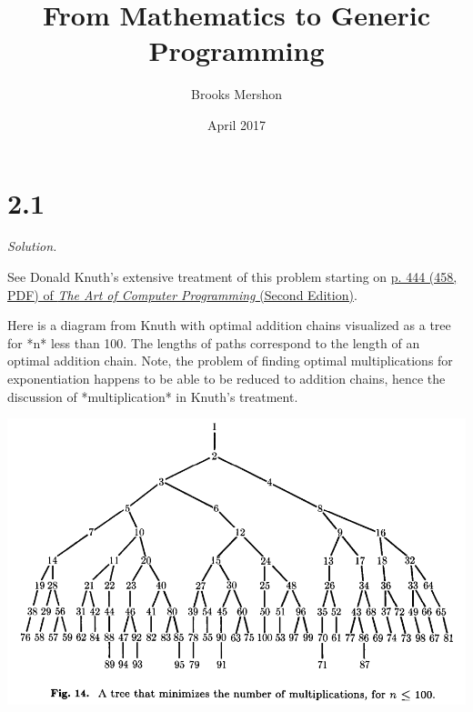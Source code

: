 \documentclass{article}
\title{From Mathematics to Generic Programming}
\author{Brooks Mershon}
\date{April 2017}
\begin{document}
\maketitle

\section*{2.1}


\textit{Solution.}

\bigskip

See Donald Knuth's extensive treatment of this problem starting on \href{http://library.aceondo.net/ebooks/Computer_Science/algorithm-the_art_of_computer_programming-knuth.pdf}{p. 444 (458, PDF) of \textit{The Art of Computer Programming} (Second Edition)}.

Here is a diagram from Knuth with optimal addition chains visualized as a tree for *n* less than 100. The lengths of paths correspond to the length of an optimal addition chain. Note, the problem of finding optimal multiplications for exponentiation happens to be able to be reduced to addition chains, hence the discussion of *multiplication* in Knuth's treatment.

\includegraphics[width=\textwidth]{addition_chains.png}
\end{document}
